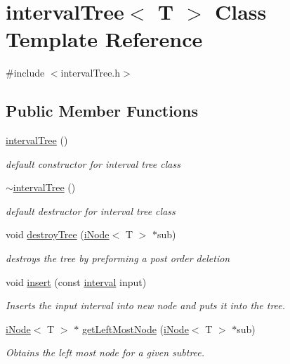 \hypertarget{classinterval_tree}{\section{interval\-Tree$<$ T $>$ Class Template Reference}
\label{classinterval_tree}
}


{\ttfamily \#include $<$interval\-Tree.\-h$>$}

\subsection*{Public Member Functions}
\begin{DoxyCompactItemize}
\item 
\hyperlink{classinterval_tree_a7d841c11fd9755560bed6f8159ac1a9e}{interval\-Tree} ()
\begin{DoxyCompactList}\small\item\em default constructor for interval tree class \end{DoxyCompactList}\item 
\hyperlink{classinterval_tree_ae3fa76db3a6fda8e7cdc0c9e84e8bfe2}{$\sim$interval\-Tree} ()
\begin{DoxyCompactList}\small\item\em default destructor for interval tree class \end{DoxyCompactList}\item 
void \hyperlink{classinterval_tree_a651e1272f876a948aea2cca238e24d65}{destroy\-Tree} (\hyperlink{classi_node}{i\-Node}$<$ T $>$ $\ast$sub)
\begin{DoxyCompactList}\small\item\em destroys the tree by preforming a post order deletion \end{DoxyCompactList}\item 
void \hyperlink{classinterval_tree_aabac1abe00232730c0b93d3cffa39b7c}{insert} (const \hyperlink{classinterval}{interval} input)
\begin{DoxyCompactList}\small\item\em Inserts the input interval into new node and puts it into the tree. \end{DoxyCompactList}\item 
\hyperlink{classi_node}{i\-Node}$<$ T $>$ $\ast$ \hyperlink{classinterval_tree_aabc282d5871443142bc744cbe1088672}{get\-Left\-Most\-Node} (\hyperlink{classi_node}{i\-Node}$<$ T $>$ $\ast$sub)
\begin{DoxyCompactList}\small\item\em Obtains the left most node for a given subtree. \end{DoxyCompactList}\item 

\end{DoxyCompactItemize}
